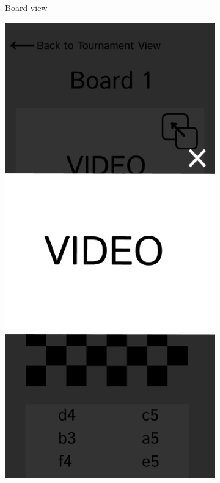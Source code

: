\begin{figure}[h!]
\begin{subfigure}[h!]{0.2\linewidth}
        \caption{Board view}
        \label{fig:phone-board-view}
    \end{subfigure}
    \hfill
    \begin{subfigure}[h!]{0.2\linewidth}
        \centering
        \includegraphics[width=\linewidth]{figures/methods/wireframes/phone-full-screen-video-view-vertical.png}

\end{subfigure}
\end{figure}
